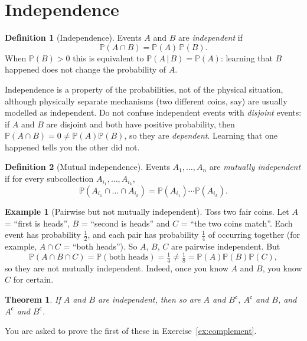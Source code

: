 \documentclass[11pt,letterpaper]{article}
\theoremstyle{definition}
\newtheorem{definition}{Definition}
\newtheorem{example}{Example}
\theoremstyle{plain}
\newtheorem{theorem}{Theorem}
\newcommand{\Prob}{\mathbb{P}}
\newcommand{\given}{\,\vert\,}
\newcommand{\comp}{^{\mathsf{c}}}
\begin{document}
\section{Independence}

\begin{definition}[Independence]
Events $A$ and $B$ are \emph{independent} if
\[
  \Prob(A \cap B) = \Prob(A)\,\Prob(B).
\]
When $\Prob(B) > 0$ this is equivalent to $\Prob(A \given B) = \Prob(A)$: learning that $B$ happened does not change the probability of $A$.
\end{definition}

Independence is a property of the probabilities, not of the physical situation, although physically separate mechanisms (two different coins, say) are usually modelled as independent. Do not confuse independent events with \emph{disjoint} events: if $A$ and $B$ are disjoint and both have positive probability, then $\Prob(A \cap B) = 0 \ne \Prob(A)\Prob(B)$, so they are \emph{dependent}. Learning that one happened tells you the other did not.

\begin{definition}[Mutual independence]
Events $A_1, \dots, A_n$ are \emph{mutually independent} if for every subcollection $A_{i_1}, \dots, A_{i_k}$,
\[
  \Prob(A_{i_1} \cap \dots \cap A_{i_k}) = \Prob(A_{i_1})\cdots\Prob(A_{i_k}).
\]
\end{definition}

\begin{example}[Pairwise but not mutually independent]
Toss two fair coins. Let $A$ = ``first is heads'', $B$ = ``second is heads'' and $C$ = ``the two coins match''. Each event has probability $\frac12$, and each pair has probability $\frac14$ of occurring together (for example, $A \cap C$ = ``both heads''). So $A$, $B$, $C$ are pairwise independent. But
\[
  \Prob(A \cap B \cap C) = \Prob(\text{both heads}) = \tfrac14 \ne \tfrac18 = \Prob(A)\Prob(B)\Prob(C),
\]
so they are not mutually independent. Indeed, once you know $A$ and $B$, you know $C$ for certain.
\end{example}

\begin{theorem}\label{thm:complement}
If $A$ and $B$ are independent, then so are $A$ and $B\comp$, $A\comp$ and $B$, and $A\comp$ and $B\comp$.
\end{theorem}

You are asked to prove the first of these in Exercise~\ref{ex:complement}.
\end{document}
